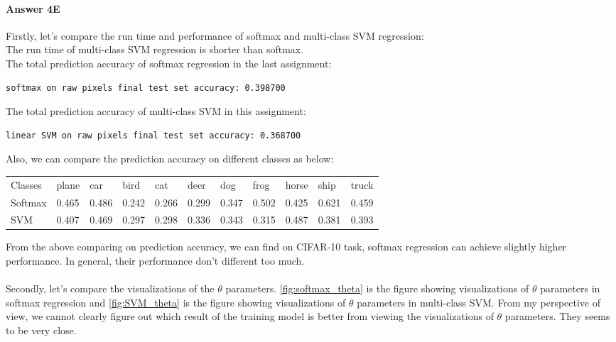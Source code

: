\documentclass[paper=a4, fontsize=11pt]{scrartcl} %
\numberwithin{equation}{section} %
\numberwithin{figure}{section} %
\numberwithin{table}{section} %
\begin{document}
\paragraph{\textbf{Answer 4E}}
Firstly, let's compare the run time and performance of softmax and multi-class SVM regression:
\\ The run time of multi-class SVM regression is shorter than softmax.
\\ The total prediction accuracy of softmax regression in the last assignment:
\begin{verbatim}
softmax on raw pixels final test set accuracy: 0.398700
\end{verbatim}
The total prediction accuracy of multi-class SVM in this assignment:
\begin{verbatim}
linear SVM on raw pixels final test set accuracy: 0.368700
\end{verbatim}
Also, we can compare the prediction accuracy on different classes as below:
\begin{table}[H]
	\centering
	\label{comparing_table}
	\begin{tabular}{lllllllllll}
	Classes            & plane & car   & bird  & cat   & deer  & dog   & frog  & horse & ship  & truck \\
	Softmax & 0.465 & 0.486 & 0.242 & 0.266 & 0.299 & 0.347 & 0.502 & 0.425 & 0.621 & 0.459 \\
	SVM                & 0.407 & 0.469 & 0.297 & 0.298 & 0.336 & 0.343 & 0.315 & 0.487 & 0.381 & 0.393 
	\end{tabular}
\end{table}
From the above comparing on prediction accuracy, we can find on CIFAR-10 task, softmax regression can achieve slightly higher performance. In general, their performance don't different too much.
\\
\\ Secondly, let's compare the visualizations of the $\theta$ parameters. \ref{fig:softmax_theta} is the figure showing visualizations of $\theta$ parameters in softmax regression and \ref{fig:SVM_theta} is the figure showing visualizations of $\theta$ parameters in multi-class SVM. From my perspective of view, we cannot clearly figure out which result of the training model is better from viewing the visualizations of $\theta$ parameters. They seems to be very close.
\end{document}

